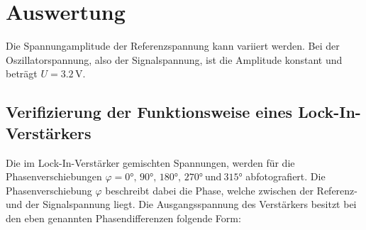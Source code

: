 %

%
\section{Auswertung}
\label{sec:Auswertung}

Die Spannungamplitude der Referenzspannung kann variiert werden. Bei der Oszillatorspannung, also der Signalspannung, 
ist die Amplitude konstant und beträgt $U=3.2 \, \unit{\volt}$.\\

\subsection{Verifizierung der Funktionsweise eines Lock-In-Verstärkers}

Die im Lock-In-Verstärker gemischten Spannungen, werden für die Phasenverschiebungen 
$\varphi= 0°,\, 90°,\, 180°,\, 270° \ \text{und} \ 315°$ abfotografiert. Die Phasenverschiebung $\varphi$ beschreibt dabei die 
Phase, welche zwischen der Referenz- und der Signalspannung liegt. Die Ausgangsspannung des Verstärkers besitzt bei den eben genannten Phasendifferenzen 
folgende Form:

